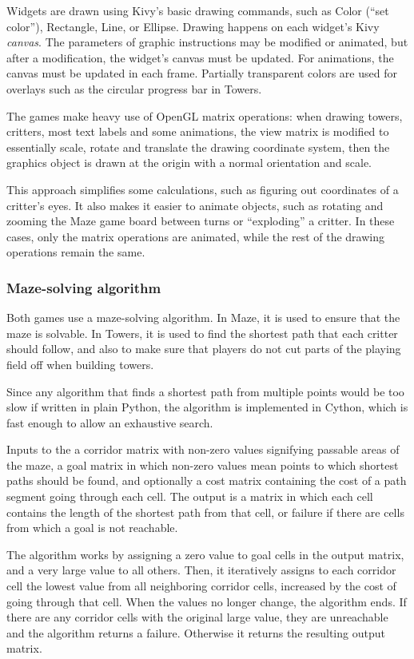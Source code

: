 \documentclass[a4paper,11pt]{article}
\begin{document}
Widgets are drawn using Kivy's basic drawing commands, such as Color
(“set color”), Rectangle, Line, or Ellipse.
Drawing happens on each widget's Kivy \emph{canvas}.
The parameters of graphic instructions may be modified or animated, but after
a modification, the widget's canvas must be updated. For animations, the canvas
must be updated in each frame.
Partially transparent colors are used for overlays such as the circular
progress bar in Towers.

The games make heavy use of OpenGL matrix operations:
when drawing towers, critters, most text labels and some animations,
the view matrix is modified to essentially scale, rotate and translate the
drawing coordinate system, then the graphics object is drawn at the origin
with a normal orientation and scale.

This approach simplifies some calculations, such as figuring out coordinates
of a critter's eyes.
It also makes it easier to animate objects, such as rotating and zooming
the Maze game board between turns or “exploding” a critter.
In these cases, only the matrix operations are animated, while the rest of
the drawing operations remain the same.

\subsubsection{Maze-solving algorithm}

Both games use a maze-solving algorithm.
In Maze, it is used to ensure that the maze is solvable.
In Towers, it is used to find the shortest path that each critter should
follow, and also to make sure that players do not cut parts of the playing
field off when building towers.

Since any algorithm that finds a shortest path from multiple points would
be too slow if written in plain Python, the algorithm is implemented in Cython,
which is fast enough to allow an exhaustive search.

Inputs to the a corridor matrix with non-zero values signifying passable areas
of the maze, a goal matrix in which non-zero values mean points to which
shortest paths should be found, and optionally a cost matrix containing
the cost of a path segment going through each cell.
The output is a matrix in which each cell contains the length of the shortest
path from that cell, or failure if there are cells from which a goal is not
reachable.

The algorithm works by assigning a zero value to goal cells in the output
matrix, and a very large value to all others.
Then, it iteratively assigns to each corridor cell the lowest value from all
neighboring corridor cells, increased by the cost of going through that cell.
When the values no longer change, the algorithm ends.
If there are any corridor cells with the original large value, they are
unreachable and the algorithm returns a failure.
Otherwise it returns the resulting output matrix.
\end{document}
